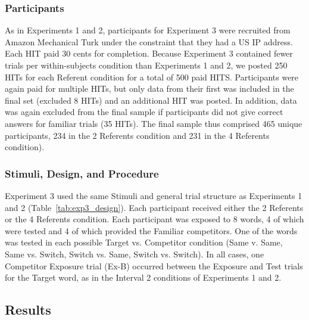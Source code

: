 \documentclass[authoryear,review]{elsarticle}
\begin{document}
\subsubsection{Participants}

As in Experiments 1 and 2, participants for Experiment 3 were recruited from Amazon Mechanical Turk under the constraint that they had a US IP address. Each HIT paid 30 cents for completion. Because Experiment 3 contained fewer trials per within-subjects condition than Experiments 1 and 2, we posted 250 HITs for each Referent condition for a total of 500 paid HITS. Participants were again paid for multiple HITs, but only data from their first was included in the final set (excluded 8 HITs) and an additional HIT was posted. In addition, data was again excluded from the final sample if participants did not give correct answers for familiar trials (35 HITs). The final sample thus comprised 465 unique participants, 234 in the 2 Referents condition and 231 in the 4 Referents condition).

\subsubsection{Stimuli, Design, and Procedure}

Experiment 3 used the same Stimuli and general trial structure as Experiments 1 and 2 (Table~\ref{tab:exp3_design}). Each participant received either the 2 Referents or the 4 Referents condition. Each participant was exposed to 8 words, 4 of which were tested and 4 of which provided the Familiar competitors. One of the words was tested in each possible Target vs. Competitor condition (Same v. Same, Same vs. Switch, Switch vs. Same, Switch vs. Switch). In all cases, one Competitor Exposure trial (Ex-B) occurred between the Exposure and Test trials for the Target word, as in the Interval 2 conditions of Experiments 1 and 2. 

\subsection{Results}
\end{document}
